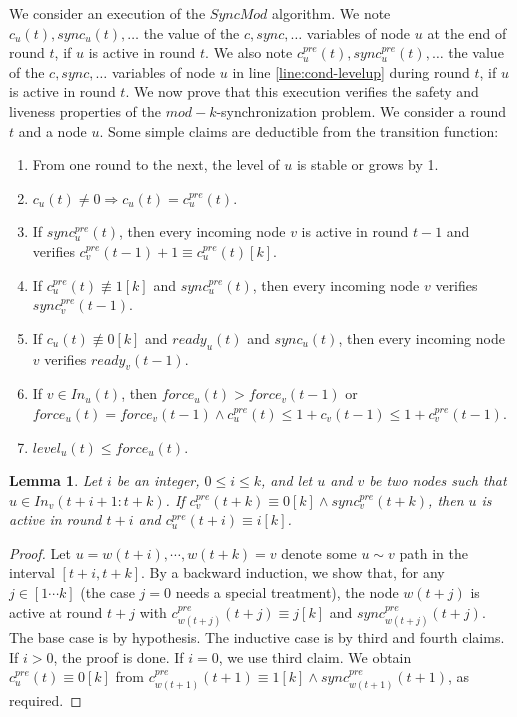\documentclass[11pt,letterpaper]{article}
\newtheorem{lem}[thm]{Lemma}
\begin{document}
We consider an execution of the $SyncMod$ algorithm.
We note $c_u(t), sync_u(t), \dots$ the value of the $c, sync, \dots$ variables of node $u$ at the end of round $t$, if $u$ is active in round $t$.
We also note $c^{pre}_u(t), sync^{pre}_u(t), \dots$ the value of the $c, sync, \dots$ variables
of node $u$ in line \ref{line:cond-levelup} during round $t$, if $u$ is active in round $t$.
We now prove that this execution verifies the safety and liveness properties of the $mod-k$-synchronization problem.
We consider a round $t$ and a node $u$.
Some simple claims are deductible from the transition function:
\begin{enumerate}
	\item From one round to the next, the level of $u$ is stable or grows by 1.
	\item $c_u(t) \neq 0 \Rightarrow c_u(t) =  c_u^{pre}(t)$.
	\item If $sync_u^{pre}(t)$, then every incoming node $v$ is active in round $t-1$ and verifies $c_v^{pre}(t-1) + 1 \equiv c_u^{pre}(t) [k]$.
	\item If $c_u^{pre}(t) \not\equiv 1 [k]$ and $sync_u^{pre}(t)$, then every incoming node $v$ verifies $sync_v^{pre}(t-1)$.
	\item If $c_u(t) \not\equiv 0 [k]$ and $ready_u(t)$ and $sync_u(t)$, then every incoming node $v$ verifies $ready_v(t-1)$.
	\item If $v \in In_u(t)$, then $force_u(t) > force_v(t-1)$ or $force_u(t) = force_v(t-1) \wedge c_u^{pre}(t) \leq 1+c_v(t-1) \leq 1+c_v^{pre}(t-1)$.
	\item $level_u(t) \leq force_u(t)$.
\end{enumerate}

\begin{lem} \label{lem:conc-safety}
	Let $i$ be an integer, $0 \leq i \leq k$, and let $u$ and $v$ be two nodes such that  $u\in In_v( t+i +1 : t+k)$.
	If $c^{pre}_v(t+k) \equiv 0 [k] \wedge sync^{pre}_v(t+k)$, then $u$ is active in round $t+i$ and $c_u^{pre}(t+i) \equiv i [k]$.
\end{lem}
\begin{proof}
	Let $u = w(t+i), \cdots, w(t+k) = v$ denote some $u \sim v$ path in the interval $[t+i,t+k]$.
	By a backward induction, we show that, for any $j \in [1 \cdots k]$ (the case $j = 0$ needs a special treatment), the node $w(t+j)$ is active at round $t + j$
	with $c_{w(t+j)}^{pre}(t+j) \equiv j [k]$ and $sync_{w(t+j)}^{pre}(t+j)$.
	The base case is by hypothesis.
	The inductive case is by third and fourth claims.
	If $i > 0$, the proof is done.
	If $i = 0$, we use third claim.
	We obtain $c_u^{pre}(t) \equiv 0 [k]$ from
	$c_{w(t+1)}^{pre}(t+1) \equiv 1 [k] \wedge sync_{w(t+1)}^{pre}(t+1)$,
	as required.
\end{proof}
\end{document}
